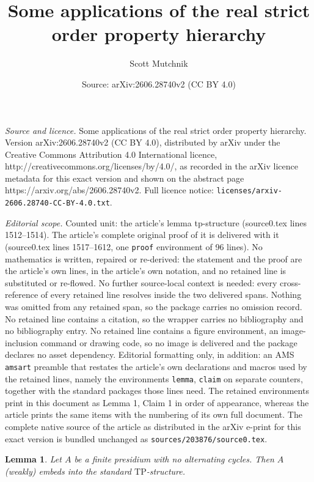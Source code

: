 \documentclass[10pt,a4paper]{amsart}
\title{Some applications of the real strict order property hierarchy}
\author{Scott Mutchnik}
\date{Source: arXiv:2606.28740v2 (CC BY 4.0)}
\newtheorem{lemma}{Lemma}
\begin{document}
\maketitle

\noindent\emph{Source and licence.} Some applications of the real strict order property hierarchy. Version arXiv:2606.28740v2 (CC BY 4.0), distributed by arXiv under the Creative Commons Attribution 4.0 International licence, http://creativecommons.org/licenses/by/4.0/, as recorded in the arXiv licence metadata for this exact version and shown on the abstract page https://arxiv.org/abs/2606.28740v2. Full licence notice: \texttt{licenses/arxiv-2606.28740-CC-BY-4.0.txt}.\par\smallskip

\noindent\textit{Editorial scope.} Counted unit: the article's lemma tp-structure (source0.tex lines 1512--1514). The article's complete original proof of it is delivered with it (source0.tex lines 1517--1612, one \texttt{proof} environment of 96 lines). No mathematics is written, repaired or re-derived: the statement and the proof are the article's own lines, in the article's own notation, and no retained line is substituted or re-flowed.  No further source-local context is needed: every cross-reference of every retained line resolves inside the two delivered spans.  Nothing was omitted from any retained span, so the package carries no omission record.  No retained line contains a citation, so the wrapper carries no bibliography and no bibliography entry.  No retained line contains a figure environment, an image-inclusion command or drawing code, so no image is delivered and the package declares no asset dependency.  Editorial formatting only, in addition: an AMS \texttt{amsart} preamble that restates the article's own declarations and macros used by the retained lines, namely the environments \texttt{lemma}, \texttt{claim} on separate counters, together with the standard packages those lines need.  The retained environments print in this document as Lemma 1, Claim 1 in order of appearance, whereas the article prints the same items with the numbering of its own full document.  The complete native source of the article as distributed in the arXiv e-print for this exact version is bundled unchanged as \texttt{sources/203876/source0.tex}.
\begin{lemma}
    \label{embedding into the standard tp-structure} Let $A$ be a finite presidium with no alternating cycles. Then $A$ (weakly) embeds into the standard $\mathrm{TP}$-structure.
\end{lemma}
\end{document}
